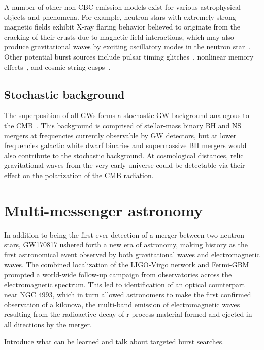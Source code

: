 A number of other non-CBC emission models exist for various astrophysical objects and phenomena.
For example, neutron stars with extremely strong magnetic fields exhibit X-ray flaring behavior believed to originate from the cracking of their crusts due to magnetic field interactions, which may also produce gravitational waves by exciting oscillatory modes in the neutron star~\citep{Lasky_2015}.
Other potential burst sources include pulsar timing glitches~\citep{pulsar_s5}, nonlinear memory effects~\citep{memory_o2}, and cosmic string cusps~\citep{strings_o3}.


\subsection{Stochastic background}

The superposition of all \acp{GW} forms a stochastic \ac{GW} background analogous to the \ac{CMB}~\citep{Christensen_2018}.
This background is comprised of stellar-mass binary \ac{BH} and \ac{NS} mergers at frequencies currently observable by \ac{GW} detectors, but at lower frequencies galactic white dwarf binaries and supermassive BH mergers would also contribute to the stochastic background.
At cosmological distances, relic gravitational waves from the very early universe could be detectable via their effect on the polarization of the \ac{CMB} radiation.


\section{Multi-messenger astronomy}\label{sec:mma}

In addition to being the first ever detection of a merger between two neutron stars, GW170817 ushered forth a new era of astronomy, making history as the first astronomical event observed by both gravitational waves and electromagnetic waves.
The combined localization of the LIGO-Virgo network and Fermi-GBM prompted a world-wide follow-up campaign from observatories across the electromagnetic spectrum.
This led to identification of an optical counterpart near NGC 4993, which in turn allowed astronomers to make the first confirmed observation of a kilonova, the multi-band emission of electromagnetic waves resulting from the radioactive decay of r-process material formed and ejected in all directions by the merger.

{\color{red}Introduce what can be learned and talk about targeted burst searches.}
